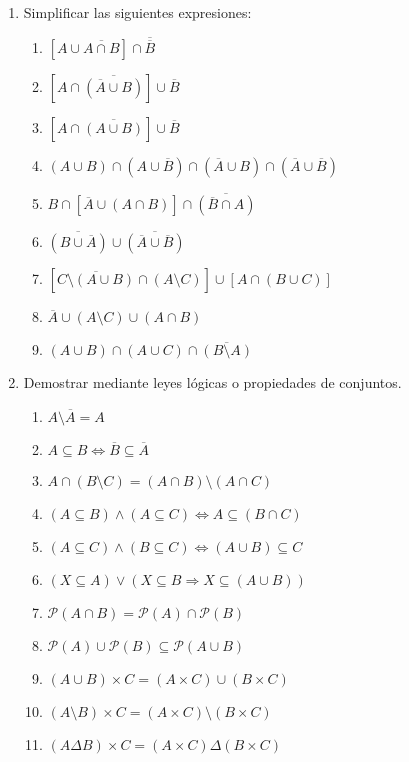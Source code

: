 \documentclass[a4paper]{article}
\newcommand{\exercise}{\item}
\newcommand{\Then}{\Rightarrow}
\newcommand{\Eq}{\Leftrightarrow}
\newcommand{\intersec}{\cap}
\newcommand{\union}{\cup}
\newcommand{\symdiff}{\Delta}
\newcommand{\compl}[1]{\overline{#1}}
\newcommand{\power}[1]{\mathcal{P}\left(#1\right)}
\begin{document}
\begin{enumerate}
\begin{enumerate} [label=(\alph*)]
	\end{enumerate}

	\exercise Simplificar las siguientes expresiones:
	\begin{multicols}{2}
	\begin{enumerate} [label=(\alph*)]
		\item $[A \union \compl{A \intersec B}] \intersec \compl{\compl{B}}$
		\item $[A \intersec \compl{(\compl{A} \union B)}] \union \compl{B}$
		\item $[A \intersec \compl{(A \union B)}] \union \compl{B}$ 
		\item $(A \union B) \intersec (A \union \compl{B}) \intersec (\compl{A} \union B) \intersec (\compl{A} \union \compl{B})$
		\item $B \intersec [\compl{A} \union (A \intersec B)] \intersec \compl{(\compl{B} \intersec A)}$
		\item $\compl{(B \union \compl{A})} \union \compl{(\compl{A} \union \compl{B})}$
		\item $[\compl{C \setminus (A \union B)} \intersec (A \setminus C)] \union [A \intersec (B \union C)]$
		\item $\compl{A} \union (A \setminus C) \union (A \intersec B)$
		\item $(A \union B) \intersec (A \union C) \intersec \compl{(B \setminus A)}$


	\end{enumerate}
	\end{multicols}

	\exercise Demostrar mediante leyes lógicas o propiedades de conjuntos.
	\begin{multicols}{2}
	\begin{enumerate} [label=(\alph*)]
		\item $A \setminus \compl{A} = A$
		\item $A \subseteq B \Eq \compl{B} \subseteq \compl{A}$
		\item $A \intersec (B\setminus C) = (A \intersec B) \setminus (A \intersec C)$
		\item $(A \subseteq B) \land (A \subseteq C) \Eq A \subseteq (B \intersec C)$
		\item $(A \subseteq C) \land (B \subseteq C) \Eq (A \union B) \subseteq C$
		\item $(X \subseteq A) \lor (X \subseteq B \Then X \subseteq (A \union B))$
		\item $\power{A \intersec B} = \power{A} \intersec \power{B}$
		\item $\power{A} \union \power{B} \subseteq \power{A\union B}$
		\item $(A\union B) \times C = (A \times C) \union (B \times C)$
		\item $(A\setminus B) \times C = (A \times C) \setminus (B \times C)$
		\item $(A\symdiff B) \times C = (A \times C) \symdiff (B \times C)$


\end{enumerate}
\end{multicols}
\end{enumerate}
\end{document}
